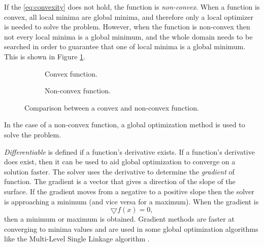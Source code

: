 If the \eqref{eq:convexity} does not hold, the function is \textit{non-convex}. When a function is convex, all local minima are global minima, and therefore only a local optimizer is needed to solve the problem. However, when the function is non-convex then not every local minima is a global minimum, and the whole domain needs to be searched in order to guarantee that one of local minima is a global minimum. This is shown in Figure \ref{fig:convexity}.  

\begin{figure}[!h]
  
  \begin{subfigure}[t]{0.5\textwidth}
      \caption{Convex function.}
    \end{subfigure}
    \vspace{2cm}
    \begin{subfigure}[t]{0.5\textwidth}
      \caption{Non-convex function.}
    \end{subfigure}
  \caption{Comparison between a convex and non-convex function.}
  \label{fig:convexity}
\end{figure}

In the case of a non-convex function, a global optimization method is used to solve the problem. 


\textit{Differentiable} is defined if a function's derivative exists. If a function's derivative does exist, then it can be used to aid global optimization to converge on a solution faster. The solver uses the derivative to determine the \textit{gradient} of function. The gradient is a vector that gives a direction of the slope of the surface. If the gradient moves from a negative to a positive slope then the solver is approaching a minimum (and vice versa for a maximum). When the gradient is
\begin{equation}
    \bigtriangledown f(x) = 0,
\end{equation}
then a minimum or maximum is obtained. Gradient methods are faster at converging to minima values and are used in some global optimization algorithms like the Multi-Level Single Linkage algorithm \cite{Liberti2000}.

